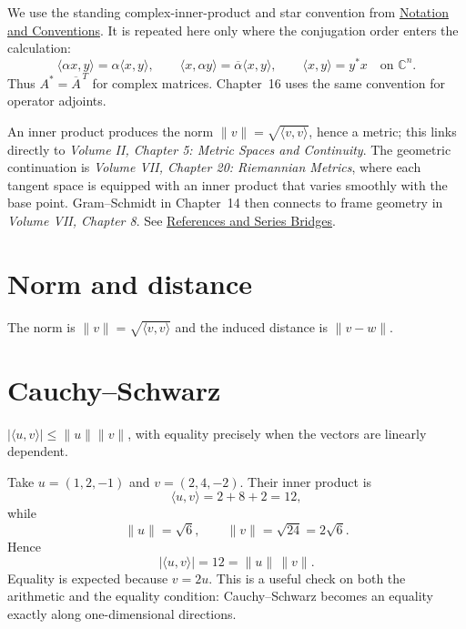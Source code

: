 \begin{remark}
We use the standing complex-inner-product and star convention from
\hyperref[sec:i-notation-and-conventions]{Notation and Conventions}. It is
repeated here only where the conjugation order enters the calculation:
\[
\langle \alpha x,y\rangle=\alpha\langle x,y\rangle,
\qquad
\langle x,\alpha y\rangle=\overline{\alpha}\langle x,y\rangle,
\qquad
\langle x,y\rangle=y^*x
\quad\text{on }\mathbb C^n.
\]
Thus \(A^*=\overline A^{\,T}\) for complex matrices. Chapter~16 uses the
same convention for operator adjoints.
\end{remark}

\begin{remark}
An inner product produces the norm \(\|v\|=\sqrt{\langle v,v\rangle}\), hence
a metric; this links directly to \emph{Volume II, Chapter 5: Metric Spaces and
Continuity}. The geometric continuation is
\emph{Volume VII, Chapter 20: Riemannian Metrics}, where each tangent space is
equipped with an inner product that varies smoothly with the base point.
Gram--Schmidt in Chapter~14 then connects to frame geometry in
\emph{Volume VII, Chapter 8}. See
\hyperref[sec:i-references-and-series-bridges]{References and Series Bridges}.
\end{remark}

\section{Norm and distance}
The norm is $\|v\|=\sqrt{\langle v,v\rangle}$ and the induced distance is $\|v-w\|$.

\section{Cauchy–Schwarz}
$|\langle u,v\rangle|\le\|u\|\|v\|$, with equality precisely when the vectors are linearly dependent.


\begin{example}\label{ex:i13-expand-01}
Take \(u=(1,2,-1)\) and \(v=(2,4,-2)\). Their inner product is
\[
\langle u,v\rangle=2+8+2=12,
\]
while
\[
\|u\|=\sqrt6,\qquad \|v\|=\sqrt{24}=2\sqrt6.
\]
Hence
\[
|\langle u,v\rangle|=12=\|u\|\,\|v\|.
\]
Equality is expected because \(v=2u\). This is a useful check on both the
arithmetic and the equality condition: Cauchy--Schwarz becomes an equality
exactly along one-dimensional directions.
\end{example}
